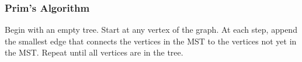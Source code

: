 \documentclass[a4paper]{article}
\theoremstyle{definition}
\begin{document}
\subsubsection{Prim's Algorithm}
Begin with an empty tree. Start at any vertex of the graph. At each step, append the smallest edge that connects the vertices in the MST to the vertices not yet in the MST. Repeat until all vertices are in the tree.
\setcounter{subfigure}{0}

\begin{figure}[H]\centering
 ~
 ~


\end{figure}
\end{document}
